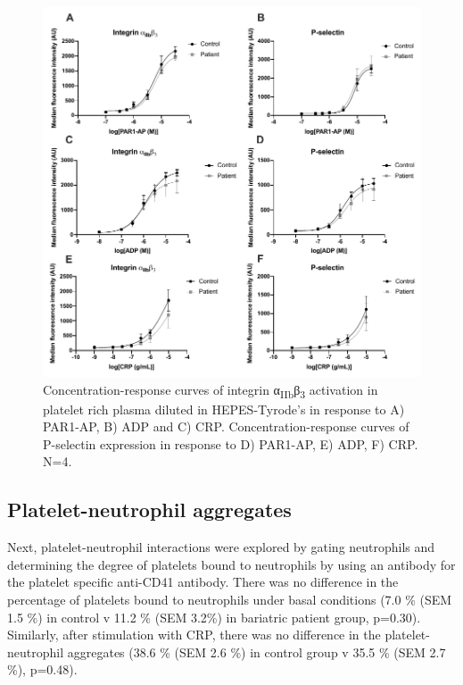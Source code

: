 \documentclass[11pt,twoside]{bristolthesis}
\begin{document}
\begin{figure}
\includegraphics[width=0.95\linewidth]{figure/Bariatric_study/Agonist_Integrin_Pselectin} \caption[Concentration-response curves of integrin α\textsubscript{IIb}β\textsubscript{3} activation and P-selectin expression]{Concentration-response curves of integrin α\textsubscript{IIb}β\textsubscript{3} activation in platelet rich plasma diluted in HEPES-Tyrode's in response to A) PAR1-AP, B) ADP and C) CRP. Concentration-response curves of P-selectin expression in response to D) PAR1-AP, E) ADP, F) CRP. N=4.}\label{fig:agonist-integrin-pselectin}
\end{figure}
\hypertarget{platelet-neutrophil-aggregates}{%
\subsection{Platelet-neutrophil aggregates}\label{platelet-neutrophil-aggregates}}

Next, platelet-neutrophil interactions were explored by gating neutrophils and determining the degree of platelets bound to neutrophils by using an antibody for the platelet specific anti-CD41 antibody. There was no difference in the percentage of platelets bound to neutrophils under basal conditions (7.0 \% (SEM 1.5 \%) in control v 11.2 \% (SEM 3.2\%) in bariatric patient group, p=0.30). Similarly, after stimulation with CRP, there was no difference in the platelet-neutrophil aggregates (38.6 \% (SEM 2.6 \%) in control group v 35.5 \% (SEM 2.7 \%), p=0.48).
\end{document}
